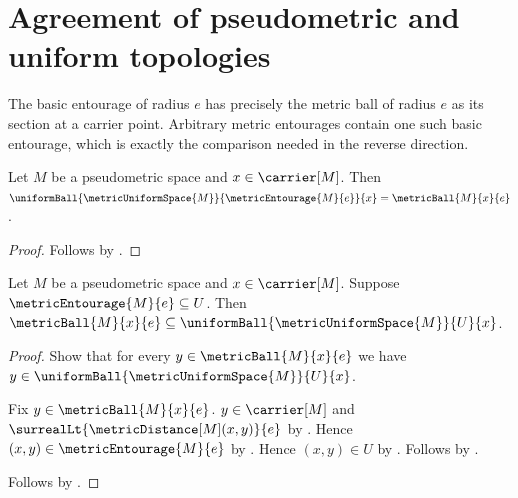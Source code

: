 


\section{Agreement of pseudometric and uniform topologies}

The basic entourage of radius $e$ has precisely the metric ball of radius
$e$ as its section at a carrier point.  Arbitrary metric entourages contain
one such basic entourage, which is exactly the comparison needed in the
reverse direction.

\begin{proposition}\label{metric_entourage_uniform_ball}
    Let $M$ be a pseudometric space and $x\in\carrier[M]$.
    Then
        $\uniformBall{\metricUniformSpace{M}}
            {\metricEntourage{M}{e}}{x}
        =\metricBall{M}{x}{e}$.
\end{proposition}
\begin{proof}
    Follows by
        .
\end{proof}

\begin{proposition}\label{metric_ball_below_uniform_ball}
    Let $M$ be a pseudometric space and $x\in\carrier[M]$.
    Suppose $\metricEntourage{M}{e}\subseteq U$.
    Then
        $\metricBall{M}{x}{e}
            \subseteq\uniformBall{\metricUniformSpace{M}}{U}{x}$.
\end{proposition}
\begin{proof}
    Show that for every $y\in\metricBall{M}{x}{e}$ we have
        $y\in\uniformBall{\metricUniformSpace{M}}{U}{x}$.
    \begin{subproof}
        Fix $y\in\metricBall{M}{x}{e}$.
        $y\in\carrier[M]$ and
            $\surrealLt{\metricDistance[M](x,y)}{e}$
            by .
        Hence $(x,y)\in\metricEntourage{M}{e}$
            by .
        Hence $(x,y)\in U$ by .
        Follows by .
    \end{subproof}
    Follows by .
\end{proof}

